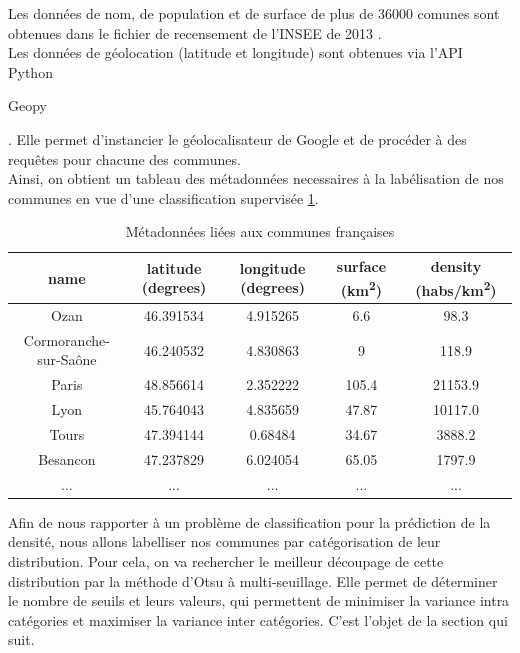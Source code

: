 \documentclass{book}
\begin{document}
Les données de nom, de population et de surface de plus de 36000 comunes sont obtenues dans le fichier de recensement de l'INSEE de 2013 \cite{insee_pop2013}.\\
Les données de géolocation (latitude et longitude) sont obtenues via l'API Python \begin{itshape}Geopy\end{itshape} \cite{geopy}. Elle permet d'instancier 
le géolocalisateur de Google et de procéder à des requêtes pour chacune des communes.\\

Ainsi, on obtient un tableau des métadonnées necessaires à la labélisation de nos communes en vue d'une classification supervisée \ref{tab_meta}.

\begin{table}[H]
\begin{center}
\begin{adjustbox}{max width=\textwidth}
{
\begin{tabular}{|c|c|c|c|c|}
\hline 
name & latitude (degrees) & longitude (degrees) & surface (km\textsuperscript{2}) & density (habs/km\textsuperscript{2}) \\
\hline
Ozan & 46.391534 & 4.915265 & 6.6 & 98.3\\
\hline 
Cormoranche-sur-Sa\^{o}ne & 46.240532 & 4.830863 & 9 & 118.9\\
\hline 
Paris & 48.856614 & 2.352222 & 105.4 & 21153.9\\
\hline
Lyon & 45.764043 & 4.835659 & 47.87 & 10117.0\\
\hline
Tours & 47.394144 & 0.68484 & 34.67 & 3888.2\\
\hline
Besancon & 47.237829 & 6.024054 & 65.05 & 1797.9\\
\hline 
... & ... & ... & ... & ... \\
\hline
\end{tabular}
}
\end{adjustbox}
\end{center}
\caption{Métadonnées liées aux communes françaises}
\label{tab_meta}
\end{table}

Afin de nous rapporter à un problème de classification pour la prédiction de la densité, nous allons labelliser nos communes par catégorisation de leur distribution.
Pour cela, on va rechercher le meilleur découpage de cette distribution par la méthode d'Otsu à multi-seuillage. Elle permet de déterminer le nombre de seuils et leurs
 valeurs, qui permettent de minimiser la variance intra catégories et maximiser la variance inter catégories. C'est l'objet de la section qui suit.
\end{document}
